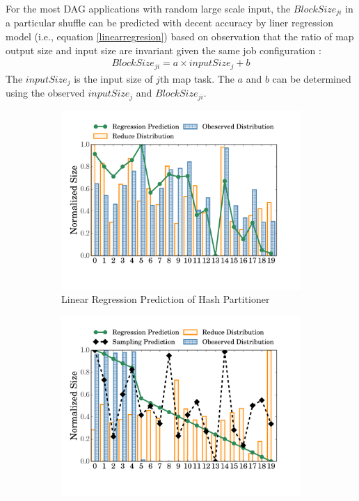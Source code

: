 For the most DAG applications with random large scale input, 
the $BlockSize_{ji}$ in a particular shuffle can be predicted with decent accuracy by liner regression model (i.e., equation \ref{linearregresion}) based on observation that the ratio of map output size and input size are invariant given the same job configuration \cite{guo2017ishuffle, predict}: 
\begin{equation}
\label{linearregresion}
\begin{aligned}
	BlockSize_{ji} = a \times inputSize_j + b
\end{aligned}
\end{equation}
The $inputSize_j$ is the input size of $j$th map task. 
The $a$ and $b$ can be determined using the observed $inputSize_j$ and $BlockSize_{ji}$.

\begin{figure}
	\centering
	\begin{subfigure}[b]{0.31\linewidth}
		\includegraphics[width=\linewidth]{fig/hash_pre}
		\caption{Linear Regression Prediction of Hash Partitioner\newline}
		\label{fig:hash_pre}
	\end{subfigure}
	\begin{subfigure}[b]{0.31\linewidth}
		\includegraphics[width=\linewidth]{fig/range_pre_sample}

\end{subfigure}
\end{figure}
